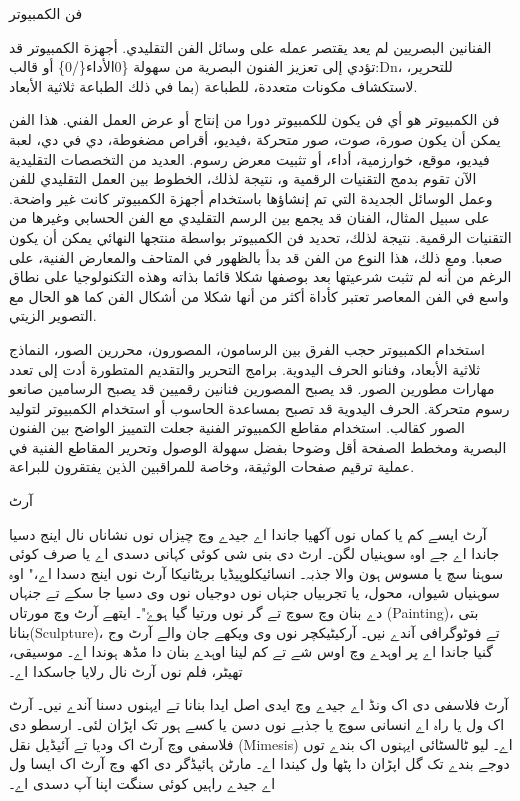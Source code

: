 \documentclass[a4paper]{article}
\begin{document}
\begin{flushright}
فن الكمبيوتر

الفنانين البصريين لم يعد يقتصر عمله على وسائل الفن التقليدي. أجهزة الكمبيوتر قد تؤدي إلى تعزيز الفنون البصرية من سهولة \{0الأداء\{/0\} أو قالب:Dn، للتحرير، لاستكشاف مكونات متعددة، للطباعة (بما في ذلك الطباعة ثلاثية الأبعاد.

فن الكمبيوتر هو أي فن يكون للكمبيوتر دورا من إنتاج أو عرض العمل الفني. هذا الفن يمكن أن يكون صورة، صوت، صور متحركة ،فيديو، أقراص مضغوطة، دي في دي، لعبة فيديو، موقع، خوارزمية، أداء، أو تثبيت معرض رسوم. العديد من التخصصات التقليدية الآن تقوم بدمج التقنيات الرقمية و، نتيجة لذلك، الخطوط بين العمل التقليدي للفن وعمل الوسائل الجديدة التي تم إنشاؤها باستخدام أجهزة الكمبيوتر كانت غير واضحة. على سبيل المثال، الفنان قد يجمع بين الرسم التقليدي مع الفن الحسابي وغيرها من التقنيات الرقمية. نتيجة لذلك، تحديد فن الكمبيوتر بواسطة منتجها النهائي يمكن أن يكون صعبا. ومع ذلك، هذا النوع من الفن قد بدأ بالظهور في المتاحف والمعارض الفنية، على الرغم من أنه لم تثبت شرعيتها بعد بوصفها شكلا قائما بذاته وهذه التكنولوجيا على نطاق واسع في الفن المعاصر تعتبر كأداة أكثر من أنها شكلا من أشكال الفن كما هو الحال مع التصوير الزيتي.

استخدام الكمبيوتر حجب الفرق بين الرسامون، المصورون، محررين الصور، النماذج ثلاثية الأبعاد، وفنانو الحرف اليدوية. برامج التحرير والتقديم المتطورة أدت إلى تعدد مهارات مطورين الصور. قد يصبح المصورين فنانين رقميين قد يصبح الرسامين صانعو رسوم متحركة. الحرف اليدوية قد تصبح بمساعدة الحاسوب أو استخدام الكمبيوتر لتوليد الصور كقالب. استخدام مقاطع الكمبيوتر الفنية جعلت التمييز الواضح بين الفنون البصرية ومخطط الصفحة أقل وضوحا بفضل سهولة الوصول وتحرير المقاطع الفنية في عملية ترقيم صفحات الوثيقة، وخاصة للمراقبين الذين يفتقرون للبراعة.



آرٹ

آرٹ ایسے کم یا کماں نوں آکھیا جاندا اے جیدے وچ چیزاں نوں نشاناں نال اینج دسیا جاندا اے جے اوہ سوہنیاں لگن۔ ارٹ دی بنی شی کوئی کہانی دسدی اے یا صرف کوئی سوہنا سچ یا مسوس ہون والا جذبہ۔ انسائیکلوپیڈیا بریٹانیکا آرٹ نوں اینج دسدا اے،" اوہ سوہنیاں شیواں، محول، یا تجربیاں جنہاں نوں دوجیاں نوں وی دسیا جا سکے تے جنہاں دے بنان وچ سوچ تے گر نوں ورتیا گیا ہوۓ"۔ ایتھے آرٹ وچ مورتاں (Painting)، بتی بنانا(Sculpture)، تے فوٹوگرافی آندے نیں۔ آرکیٹیکچر نوں وی ویکھے جان والے آرٹ وج گنیا جاندا اے پر اوہدے وچ اوس شے تے کم لینا اوہدے بنان دا مڈھ ہوندا اے۔ موسیقی، تھیٹر، فلم نوں آرٹ نال رلایا جاسکدا اے۔

آرٹ فلاسفی دی اک ونڈ اے جیدے وچ ایدی اصل ایدا بنانا تے ایہنوں دسنا آندے نیں۔ آرٹ اک ول یا راہ اے انسانی سوچ یا جذبے نوں دسن یا کسے ہور تک اپڑان لئی۔ ارسطو دی فلاسفی وچ آرٹ اک ودیا تے آئیڈیل نقل (Mimesis) اے۔ لیو ٹالسٹائی ایہنوں اک بندے توں دوجے بندے تک گل اپڑان دا پٹھا ول کیندا اے۔ مارٹن ہائیڈگر دی اکھ وچ آرٹ اک ایسا ول اے جیدے راہیں کوئی سنگت اپنا آپ دسدی اے۔




\end{flushright}
\end{document}
